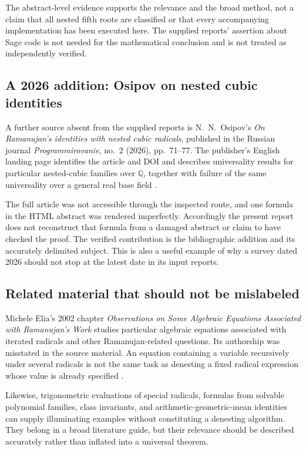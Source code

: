 \documentclass[11pt,letterpaper]{article}
\numberwithin{equation}{section}
\theoremstyle{definition}
\theoremstyle{remark}
\newcommand{\Q}{\mathbb{Q}}
\begin{document}
The abstract-level evidence supports the relevance and the broad method, not a claim that all nested fifth roots are classified or that every accompanying implementation has been executed here. The supplied reports' assertion about Sage code is not needed for the mathematical conclusion and is not treated as independently verified.

\subsection{A 2026 addition: Osipov on nested cubic identities}
A further source absent from the supplied reports is N.~N.~Osipov's \emph{On Ramanujan's identities with nested cubic radicals}, published in the Russian journal \emph{Programmirovanie}, no.~2 (2026), pp.~71--77. The publisher's English landing page identifies the article and DOI and describes universality results for particular nested-cubic families over $\Q$, together with failure of the same universality over a general real base field \cite{osipov26}.

The full article was not accessible through the inspected route, and one formula in the HTML abstract was rendered imperfectly. Accordingly the present report does not reconstruct that formula from a damaged abstract or claim to have checked the proof. The verified contribution is the bibliographic addition and its accurately delimited subject. This is also a useful example of why a survey dated 2026 should not stop at the latest date in its input reports.

\subsection{Related material that should not be mislabeled}
Michele Elia's 2002 chapter \emph{Observations on Some Algebraic Equations Associated with Ramanujan's Work} studies particular algebraic equations associated with iterated radicals and other Ramanujan-related questions. Its authorship was misstated in the source material. An equation containing a variable recursively under several radicals is not the same task as denesting a fixed radical expression whose value is already specified \cite{elia}.

Likewise, trigonometric evaluations of special radicals, formulas from solvable polynomial families, class invariants, and arithmetic-geometric-mean identities can supply illuminating examples without constituting a denesting algorithm. They belong in a broad literature guide, but their relevance should be described accurately rather than inflated into a universal theorem.
\end{document}
